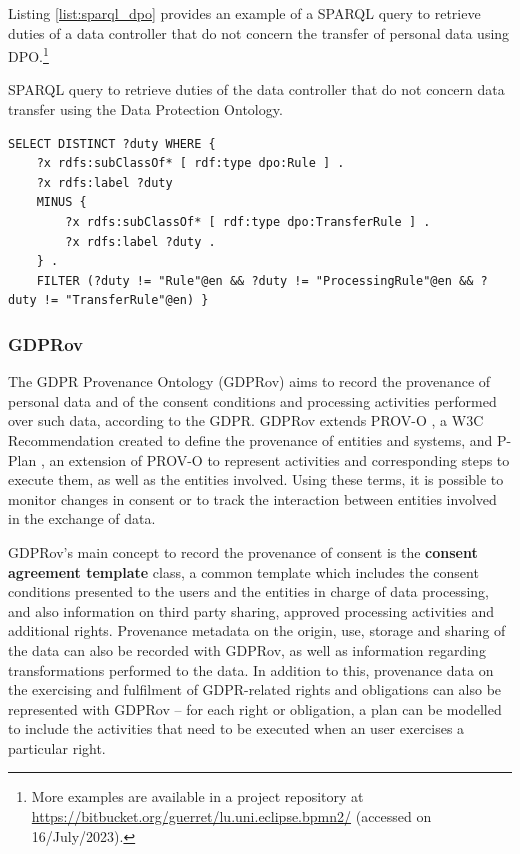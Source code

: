 Listing \ref{list:sparql_dpo} provides an example of a SPARQL query to retrieve duties of a data controller that do not concern the transfer of personal data using DPO.\footnote{More examples are available in a project repository at \url{https://bitbucket.org/guerret/lu.uni.eclipse.bpmn2/} (accessed on 16/July/2023).}

\begin{listing}
\caption{SPARQL query to retrieve duties of the data controller that do not concern data transfer using the Data Protection Ontology.}
\label{list:sparql_dpo}
\begin{verbatim}
SELECT DISTINCT ?duty WHERE {
    ?x rdfs:subClassOf* [ rdf:type dpo:Rule ] .
	?x rdfs:label ?duty
	MINUS {
		?x rdfs:subClassOf* [ rdf:type dpo:TransferRule ] .
		?x rdfs:label ?duty .
	} .
	FILTER (?duty != "Rule"@en && ?duty != "ProcessingRule"@en && ?duty != "TransferRule"@en) }
\end{verbatim}
\end{listing}

\subsubsection{GDPRov}
\label{sec:gdprov}

The GDPR Provenance Ontology (GDPRov) \citep{pandit_modelling_2017} aims to record the provenance of personal data and of the consent conditions and processing activities performed over such data, according to the GDPR.
GDPRov extends PROV-O \citep{lebo_prov-o_2013}, a W3C Recommendation created to define the provenance of entities and systems, and P-Plan \citep{garijo_augmenting_2012}, an extension of PROV-O to represent activities and corresponding steps to execute them, as well as the entities involved.
Using these terms, it is possible to monitor changes in consent or to track the interaction between entities involved in the exchange of data.

GDPRov's main concept to record the provenance of consent is the \textbf{consent agreement template} class, a common template which includes the consent conditions presented to the users and the entities in charge of data  processing, and also information on third party sharing, approved processing activities and additional rights.
Provenance metadata on the origin, use, storage and sharing of the data can also be recorded with GDPRov, as well as information regarding transformations performed to the data.
In addition to this, provenance data on the exercising and fulfilment of GDPR-related rights and obligations can also be represented with GDPRov -- for each right or obligation, a plan can be modelled to include the activities that need to be executed when an user exercises a particular right.

